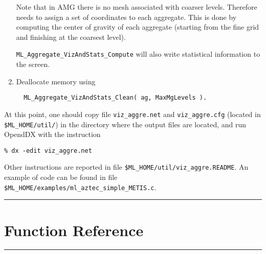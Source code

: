 \documentclass[10pt,letter,relax]{SANDreport}
\newcommand{\HRule}{\noindent\rule{\linewidth}{1mm}}
\begin{document}
\begin{enumerate}
   Note that in AMG there is no mesh associated with coarser
   levels. Therefore  needs to
   assign a set of coordinates  to each aggregate.
   This is done by computing the center
   of gravity of each aggregate (starting from the fine grid and finishing
   at the coarsest level).

   \verb!ML_Aggregate_VizAndStats_Compute!
   will also write statistical
   information to the screen.

\item Deallocate memory using
\begin{verbatim}
  ML_Aggregate_VizAndStats_Clean( ag, MaxMgLevels ).
\end{verbatim}
\end{enumerate}

At this point, one should copy file \verb!viz_aggre.net! and
\verb!viz_aggre.cfg! (located in \verb!$ML_HOME/util/!) in the directory
where the output files are located, and run OpendDX with the instruction
\begin{verbatim}
% dx -edit viz_aggre.net
\end{verbatim}
Other instructions are reported in file
\verb!$ML_HOME/util/viz_aggre.README!. An example of code can be found in
file \verb!$ML_HOME/examples/ml_aztec_simple_METIS.c!.


\clearpage
\newpage

\vspace*{3cm}
\HRule
\part{Function Reference}
\HRule
\clearpage
\newpage




\end{document}
